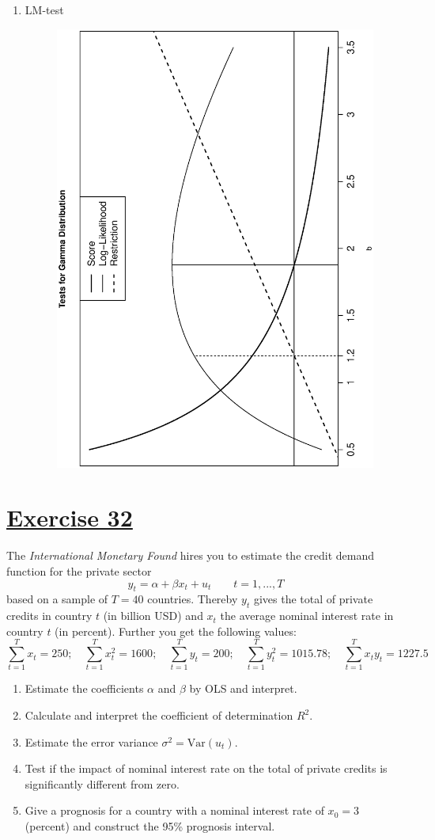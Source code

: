 \documentclass[captions=tableheading, 12pt, headings=small, parskip=half]{scrartcl}
\begin{document}
\begin{enumerate}[label = \alph*)]
\begin{figure}[H]
\end{figure}
	\item LM-test
\begin{figure}[H]
	\centering
	\includegraphics[height = 0.75\columnwidth, angle = -90]{Code1/Gamma_LM.eps}
\end{figure}
\end{enumerate}

\newpage
\section*{\underline{Exercise 32}}
The \textit{International Monetary Found} hires you to estimate the credit demand function for the private sector
\[
	y_t = \alpha + \beta x_t + u_t\qquad t = 1,...,T
\]based on a sample of $T = 40$ countries. Thereby $y_t$ gives the total of private credits in country $t$ (in billion USD) and $x_t$ the average nominal interest rate in country $t$ (in percent). Further you get the following values:
\[
	\sum_{t = 1}^T{x_t} = 250; \quad \sum_{t = 1}^T{x_t^2} = 1600; \quad \sum_{t = 1}^T{y_t} = 200; \quad
\sum_{t = 1}^T{y_t^2}=1015.78; \quad \sum_{t = 1}^T{x_ty_t} = 1227.5
\]
\begin{enumerate}[label = \alph*)]
	\item Estimate the coefficients $\alpha$ and $\beta$ by OLS and interpret.
	\item Calculate and interpret the coefficient of determination $R^2$.
	\item Estimate the error variance $\sigma^2 = \textrm{Var}(u_t)$.
	\item Test if the impact of nominal interest rate on the total of private credits is significantly different from zero.
	\item Give a prognosis for a country with a nominal interest rate of $x_0 = 3$ (percent) and construct the 95\% prognosis interval. 
\end{enumerate}
\end{document}
